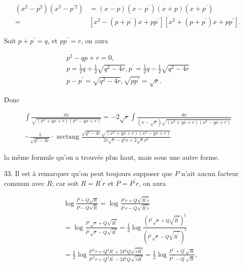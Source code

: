 \documentclass{article}
\begin{document}
\[
\begin{aligned}
\left(x^{2}-p^{2}\right)\left(x^{2}-p^{\prime 2}\right) & =(x-p)\left(x-p^{\prime}\right)(x+p)\left(x+p^{\prime}\right) \\
= & {\left[x^{2}-\left(p+p^{\prime}\right) x+p p^{\prime}\right]\left[x^{2}+\left(p+p^{\prime}\right) x+p p^{\prime}\right] . }
\end{aligned}
\]

Soit \(p+p^{\prime}=q\), et \(p p^{\prime}=r\), on aura

\[
\begin{gathered}
p^{2}-q p+r=0, \\
p=\frac{1}{2} q+\frac{1}{2} \sqrt{q^{2}-4 r}, p^{\prime}=\frac{1}{2} q-\frac{1}{2} \sqrt{q^{2}-4 r} \\
p-p^{\prime}=\sqrt{q^{2}-4 r}, \sqrt{p p^{\prime}}=\sqrt{r} .
\end{gathered}
\]

Donc

\[
\begin{array}{r}
\int \frac{d x}{\sqrt{\left(x^{2}+q x+r\right)\left(x^{2}-q x+r\right)}}=-2 \sqrt{r} \int \frac{d x}{(x-\sqrt{r}) \sqrt{\left(x^{2}+q x+r\right)\left(x^{2}-q x+r\right)}} \\
-\frac{1}{\sqrt{q^{2}-4 r}} \cdot \operatorname{arctang} \frac{\sqrt{q^{2}-4 r} \sqrt{\left(x^{2}+q x+r\right)\left(x^{2}-q x+r\right)}}{2 r \sqrt{r}-q^{2} x+2 \sqrt{r} x^{2}}
\end{array}
\]

la même formule qu'on a trouvée plus haut, mais sous une autre forme.

33. Il est à remarquer qu'on peut toujours supposer que \(P\) n'ait aucun facteur commun avec \(R\); car soit \(R=R^{\prime} r\) et \(P=P^{\prime} r\), on aura

\[
\begin{aligned}
& \log \frac{P+Q \sqrt{R}}{P-Q \sqrt{\bar{R}}}=\log \frac{P^{\prime} r+Q \sqrt{R^{\prime} r}}{P^{\prime} r-Q \sqrt{R^{\prime} r}} \\
& =\log \frac{P^{\prime} \sqrt{r}+Q \sqrt{R^{\prime}}}{P^{\prime} \sqrt{r}-Q \sqrt{R^{\prime}}}=\frac{1}{2} \log \frac{\left(P^{\prime} \sqrt{r}+Q \sqrt{\bar{R}^{\prime}}\right)^{2}}{\left(P^{\prime} \sqrt{r}-Q \sqrt{{R^{\prime}}^{\prime}}\right)^{2}} \\
& =\frac{1}{2} \log \frac{P^{\prime 2} r+Q^{2} R^{\prime}+2 P^{\prime} Q \sqrt{r R^{\prime}}}{P^{\prime 2} r+Q^{2} R^{\prime}-2 P^{\prime} Q \sqrt{r R^{\prime}}}=\frac{1}{2} \log \frac{P^{\prime \prime}+Q^{\prime} \sqrt{R}}{P^{\prime \prime}-Q^{\prime} \sqrt{R}},
\end{aligned}
\]
\end{document}
